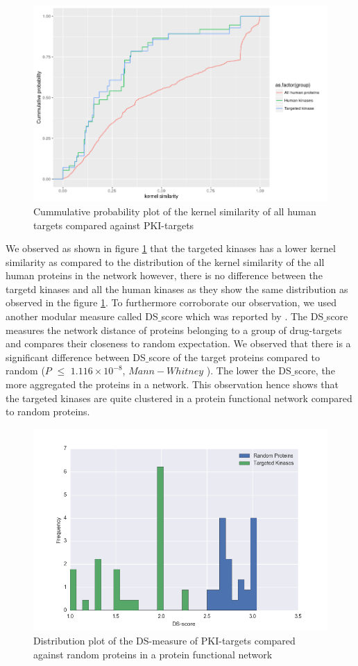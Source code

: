 \documentclass[a4paper, 11pt]{article}
\begin{document}
\begin{figure}[H]
	\includegraphics[width=\linewidth]{figures/ksim_hum.png}
	\centering
	\caption{Cummulative probability plot of the kernel similarity of all human targets compared against PKI-targets}
	\label{sim_plot}
\end{figure}
We observed as shown in figure \ref{sim_plot} that the targeted kinases has a lower kernel similarity as compared to the distribution of the kernel similarity of the all human proteins in the network however, there is no difference between the targetd kinases and all the human kinases as they show the same distribution as observed in the figure \ref{sim_plot}. To furthermore corroborate  our observation, we used another modular measure called DS$\_$score which was reported by \cite{menche2015uncovering}. The DS$\_$score measures the network distance of proteins  belonging to a group of drug-targets and compares their closeness to random expectation. We observed that there is a significant difference between DS$\_$score of the target proteins compared to random ($P$ $\le$ $1.116\times10^{-8}$, $Mann-Whitney$ ). The lower the DS$\_$score, the more aggregated the proteins in a network. This observation hence shows that the targeted kinases are quite clustered in a protein functional network compared to random proteins. 
\begin{figure}[H]
	\includegraphics[width=.9\linewidth]{figures/mean_ds.png}
	\centering
	\caption{Distribution plot of the DS-measure of PKI-targets  compared against random proteins in a protein functional network}
	\label{ds_plot}
\end{figure}
\end{document}

